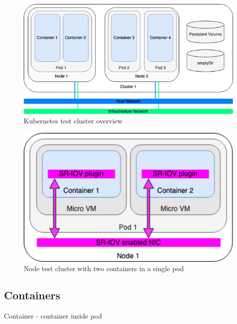 \begin{figure}[ht]
  \begin{center}
    \includegraphics[width=13.5cm]{images/TestArchitectureCluster.png}
    \caption{Kubernetes test cluster overview}
    \label{fig:TestArchitectureCluster}
  \end{center}
\end{figure}

\begin{figure}[ht]
  \begin{center}
    \includegraphics[width=13.5cm]{images/TestArchitectureNode.png}
    \caption{Node test cluster with two containers in a single pod}
    \label{fig:TestArchitectureNode}
  \end{center}
\end{figure}

\subsection{Containers}

Container - container inside pod

